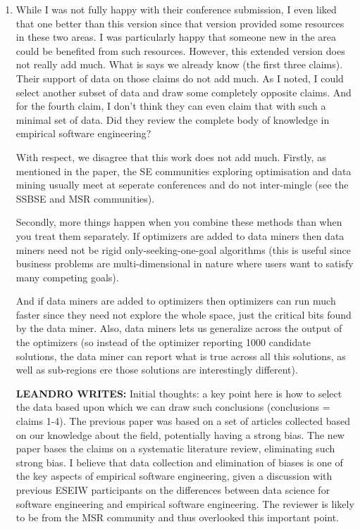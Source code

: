 \documentclass{article}
\newenvironment{com}{\color{blue}\begin{itshape}}{\end{itshape}\vspace{1ex}}
\begin{document}
\begin{enumerate}
\item \begin{com}
While I was not fully happy with their conference submission, I even liked that one better than this version since that version provided some resources in these two areas. I was particularly happy that someone new in the area could be benefited from such resources. However, this extended version does not really add much. What is says we already know (the first three claims). Their support of data on those claims do not add much. As I noted, I could select another subset of data and draw some completely opposite claims. And for the fourth claim, I don't think they can even claim that with such a minimal set of data. Did they review the complete body of knowledge in empirical software engineering? 
\end{com}

With respect, we disagree that this work does not add much. Firstly, as mentioned in the paper, the SE communities
exploring optimisation and data mining usually meet at seperate conferences and do not inter-mingle (see the SSBSE and MSR communities).

Secondly, more things happen when you combine these methods than when you treat them separately. If optimizers are added
to data miners then data miners need not be rigid only-seeking-one-goal algorithms (this is useful since business problems are multi-dimensional
in nature where users want to satisfy many competing goals). 

And if data miners are added to optimizers then optimizers can run much faster since they need not explore the whole space, just the critical bits found by the data miner. Also, data miners lets us generalize across the output of the optimizers (so instead of the optimizer reporting 1000 candidate solutions, the data miner can report what is true across all this solutions, as well as sub-regions ere those solutions are interestingly  different). 

{\bf LEANDRO WRITES:}
Initial thoughts: a key point here is how to select the data based upon which we can draw such conclusions (conclusions = claims 1-4). The previous paper was based on a set of articles collected based on our knowledge about the field, potentially having a strong bias. The new paper bases the claims on a systematic literature review, eliminating such strong bias. I believe that data collection and elimination of biases is one of the key aspects of empirical software engineering, given a discussion with previous ESEIW participants on the differences between data science for software engineering and empirical software engineering. The reviewer is likely to be from the MSR community and thus overlooked this important point.


\end{enumerate}
\end{document}
